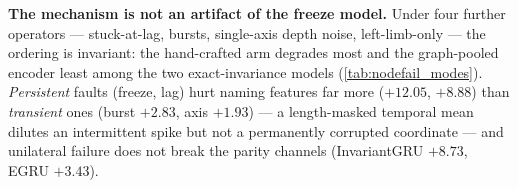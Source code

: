 \documentclass[10pt,twocolumn,letterpaper]{article}
\begin{document}
\textbf{The mechanism is not an artifact of the freeze model.} Under four further operators ---
stuck-at-lag, bursts, single-axis depth noise, left-limb-only --- the ordering is invariant: the
hand-crafted arm degrades most and the graph-pooled encoder least among the two exact-invariance
models (\cref{tab:nodefail_modes}). \emph{Persistent} faults (freeze, lag) hurt naming features far
more ($+12.05$, $+8.88$) than \emph{transient} ones (burst $+2.83$, axis $+1.93$) --- a length-masked
temporal mean dilutes an intermittent spike but not a permanently corrupted coordinate --- and
unilateral failure does not break the parity channels (InvariantGRU $+8.73$, EGRU $+3.43$).

\begin{table}[t]\centering\scriptsize
\setlength{\tabcolsep}{3pt}
\caption{Node failure under five operators (chiral models, 3 seeds $\times$ 5 folds, hash-locked).
Each cell: MAD at $k{=}1$ / $k{=}8$ and total lost. The freeze/random row reproduces
\cref{tab:nodefail}.}
\label{tab:nodefail_modes}
\end{table}
\end{document}
